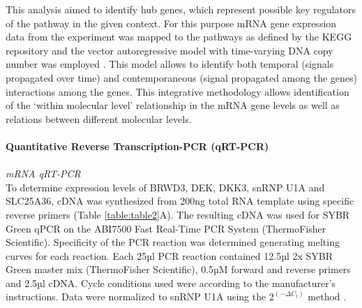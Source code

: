 This analysis aimed to identify hub genes, which represent possible key regulators of the pathway in the given context. For this purpose mRNA gene expression data from the experiment was mapped to the pathways as defined by the KEGG repository \cite{Kanehisa2000} and the vector autoregressive model with time-varying DNA copy number was employed \cite{Miok2017}. This model allows to identify both temporal (signals propagated over time) and contemporaneous (signal propagated among the genes) interactions among the genes. This integrative methodology allows identification of the ‘within molecular level’ relationship in the mRNA gene levels as well as relations between different molecular levels.
\\
\\
\textbf{Quantitative Reverse Transcription-PCR (qRT-PCR)}
\\
\\
\textit{mRNA qRT-PCR}
\\
To determine expression levels of BRWD3, DEK, DKK3, snRNP U1A and SLC25A36, cDNA was synthesized from 200ng total RNA template using specific reverse primers (Table \ref{table:table2}A). The resulting cDNA was used for SYBR Green qPCR on the ABI7500 Fast Real-Time PCR System (ThermoFisher Scientific). Specificity of the PCR reaction was determined generating melting curves for each reaction. Each 25µl PCR reaction contained 12.5µl 2x SYBR Green master mix (ThermoFisher Scientific), 0.5µM forward and reverse primers and 2.5µl cDNA. Cycle conditions used were according to the manufacturer’s instructions. Data were normalized to snRNP U1A using the $2^{(- \Delta C_t )}$ method \cite{Livak2001}.
